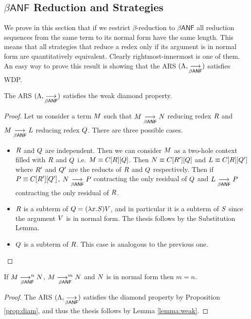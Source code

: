 \begin{LONG}
	\subsection{$\beta\textsf{ANF}$ Reduction and Strategies}
	We prove in this section that if we restrict $\beta$-reduction to $\beta\mathsf{ANF}$ all reduction sequences from the same term to its normal form have the same length. This means that all strategies that reduce a redex only if its argument is in normal form are quantitatively equivalent. Clearly rightmost-innermost is one of them. An easy way to prove this result is showing that the ARS $(\Lambda, \underset{\beta\textsf{ANF}}{\longrightarrow})$ satisfies WDP.
	\begin{proposition}\label{prop:diam}
		The ARS $(\Lambda, \underset{\beta\textsf{ANF}}{\longrightarrow})$ satisfies the weak diamond property.
	\end{proposition}
	\begin{proof}
		Let us consider a term $M$ such that $M\underset{\beta\textsf{ANF}}{\longrightarrow}N$ reducing redex $R$ and $M\underset{\beta\textsf{ANF}}{\longrightarrow}L$ reducing redex $Q$. There are three possible cases.
		\begin{itemize}
			\item $R$ and $Q$ are independent. Then we can consider $M$ as a two-hole context filled with $R$ and $Q$ i.e. $M\equiv C[R][Q]$. Then $N\equiv C[R'][Q]$ and $L\equiv C[R][Q']$ where $R'$ and $Q'$ are the reducts of $R$ and $Q$ respectively. Then if $P\equiv C[R'][Q']$, $N\underset{\beta\textsf{ANF}}{\longrightarrow}P$ contracting the only residual of $Q$ and $L\underset{\beta\textsf{ANF}}{\longrightarrow}P$ contracting the only residual of $R$.
			\item $R$ is a subterm of $Q=(\lambda x.S)V$, and in particular it is a subterm of $S$ since the argument $V$ is in normal form. The thesis follows by the Substitution Lemma.
			\item $Q$ is a subterm of $R$. This case is analogous to the previous one.
		\end{itemize}
	\end{proof}
	\begin{corollary}\label{corollary:equiv}
		If $M\underset{\beta\textsf{ANF}}{\longrightarrow^{n}}N$, $M\underset{\beta\textsf{ANF}}{\longrightarrow^{m}}N$ and $N$ is in normal form then $m=n$.
	\end{corollary}
	\begin{proof}
		The ARS $(\Lambda, \underset{\beta\textsf{ANF}}{\longrightarrow})$ satisfies the diamond property by Proposition \ref{prop:diam}, and thus the thesis follows by Lemma \ref{lemma:weak}.
	\end{proof}

\end{LONG}
